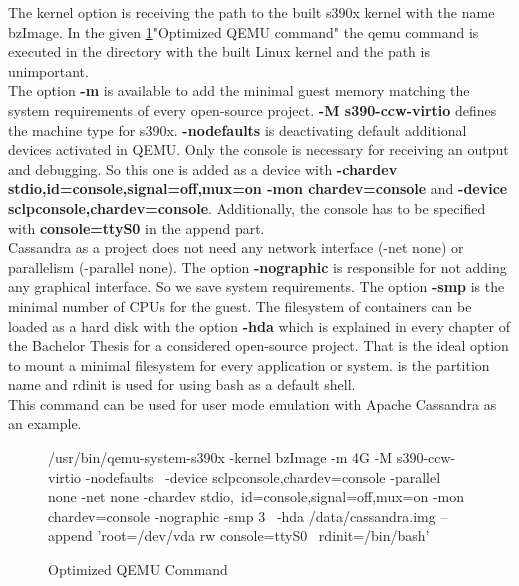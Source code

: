 The kernel option is receiving the path to the built s390x kernel with the name bzImage. In the given \ref{QEMU-Command}"Optimized QEMU command" the qemu command is executed in the directory with the built Linux kernel and the path is unimportant. \\  
The option \textbf{-m} is available to add the minimal guest memory matching the system requirements of every open-source project. \textbf{-M s390-ccw-virtio} defines the machine type for s390x.
\textbf{-nodefaults} is deactivating default additional devices activated in QEMU. 
Only the console is necessary for receiving an output and debugging. 
So this one is added as a device with \textbf{-chardev stdio,id=console,signal=off,mux=on -mon chardev=console} and \textbf{-device sclpconsole,chardev=console}. Additionally, the console has to be specified with \textbf{console=ttyS0} in the append part. \\ 
Cassandra as a project does not need any network interface (-net none) or parallelism (-parallel none). The option \textbf{-nographic} is responsible for not adding any graphical interface. 
So we save system requirements. The option \textbf{-smp} is the minimal number of CPUs for the guest. 
The filesystem of containers can be loaded as a hard disk with the option \textbf{-hda} which is explained in every chapter of the Bachelor Thesis for a considered open-source project. 
That is the ideal option to mount a minimal filesystem for every application or system. 
 is the partition name and rdinit is used for using bash as a default shell. \\
This command can be used for user mode emulation with Apache Cassandra as an example.


\begin{figure}[H]
\centering
\begin{boxedverbatim}
/usr/bin/qemu-system-s390x -kernel bzImage -m 4G -M s390-ccw-virtio -nodefaults \
-device sclpconsole,chardev=console -parallel none -net none -chardev stdio,\
id=console,signal=off,mux=on -mon chardev=console -nographic -smp 3 \
-hda /data/cassandra.img  --append 'root=/dev/vda rw console=ttyS0 \
rdinit=/bin/bash'
\end{boxedverbatim}
 \caption{Optimized QEMU Command}
    \label{QEMU-Command}
\end{figure}

